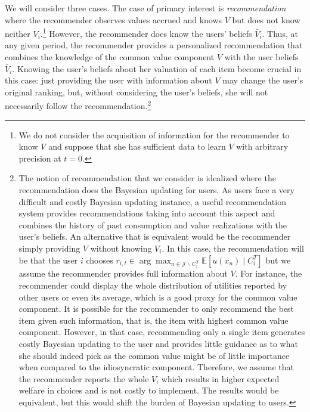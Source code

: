 \documentclass[format=acmsmall, review=false]{acmart}
\begin{document}
We will consider three cases. The case of primary interest is \textit{recommendation} where the recommender observes values accrued and knows $V$ but does not know neither $V_i$.\footnote{We do not consider the acquisition of information for the recommender to know $V$ and suppose that she has sufficient data to learn $V$ with arbitrary precision at $t = 0$.} However, the recommender does know the users' beliefs $\bar V_i$. Thus, at any given period, the recommender provides a personalized recommendation that combines the knowledge of the common value component $V$ with the user beliefs $\bar V_i$. Knowing the user's beliefs about her valuation of each item become crucial in this case: just providing the user with information about $V$ may change the user's original ranking, but, without considering the user's beliefs, she will not necessarily follow the recommendation.\footnote{The notion of recommendation that we consider is idealized where the recommendation does the Bayesian updating for users. As users face a very difficult and costly Bayesian updating instance, a useful recommendation system provides recommendations taking into account this aspect and combines the history of past consumption and value realizations with the user's beliefs. 
An alternative that is equivalent would be the recommender simply providing $V$ without knowing $V_i$. In this case, the recommendation will be that the user $i$ chooses $r_{i,t} \in \arg \max_{n\in \mathcal J\backslash C^T_i} \mathbb E[u(x_n) \mid C_i^T]$
but we assume the recommender provides full information about $V$. For instance, the recommender could display the whole distribution of utilities reported by other users or even its average, which is a good proxy for the common value component. It is possible for the recommender to only recommend the best item given such information, that is, the item with highest common value component. However, in that case, recommending only a single item generates costly Bayesian updating to the user and provides little guidance as to what she should indeed pick as the common value might be of little importance when compared to the idiosyncratic component. Therefore, we assume that the recommender reports the whole $V$, which results in higher expected welfare in choices and is not costly to implement.
The results would be equivalent, but this would shift the burden of Bayesian updating to users.}
\par
\end{document}
